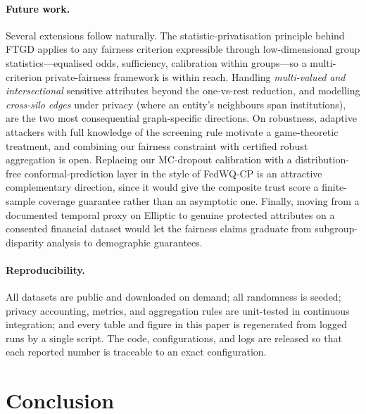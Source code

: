 \documentclass[pdflatex,sn-mathphys-num]{sn-jnl}
\theoremstyle{thmstyleone}%
\theoremstyle{thmstyletwo}%
\theoremstyle{thmstylethree}%
\begin{document}
\paragraph{Future work.}
Several extensions follow naturally. The statistic-privatisation principle
behind FTGD applies to any fairness criterion expressible through
low-dimensional group statistics---equalised odds, sufficiency, calibration
within groups---so a multi-criterion private-fairness framework is within reach.
Handling \emph{multi-valued and intersectional} sensitive attributes beyond the
one-vs-rest reduction, and modelling \emph{cross-silo edges} under privacy
(where an entity's neighbours span institutions), are the two most consequential
graph-specific directions. On robustness, adaptive attackers with full knowledge
of the screening rule motivate a game-theoretic treatment, and combining our
fairness constraint with certified robust aggregation is open. Replacing our
MC-dropout calibration with a distribution-free conformal-prediction layer in
the style of FedWQ-CP \cite{nguyen2026conformal} is an attractive
complementary direction, since it would give the composite trust score a
finite-sample coverage guarantee rather than an asymptotic one. Finally,
moving from a documented temporal proxy on Elliptic to genuine protected
attributes on a consented financial dataset would let the fairness claims
graduate from subgroup-disparity analysis to demographic guarantees.

\paragraph{Reproducibility.}
All datasets are public and downloaded on demand; all randomness is seeded;
privacy accounting, metrics, and aggregation rules are unit-tested in continuous
integration; and every table and figure in this paper is regenerated from logged
runs by a single script. The code, configurations, and logs are released so that
each reported number is traceable to an exact configuration.

\section{Conclusion}
\label{sec:conclusion}
\end{document}
